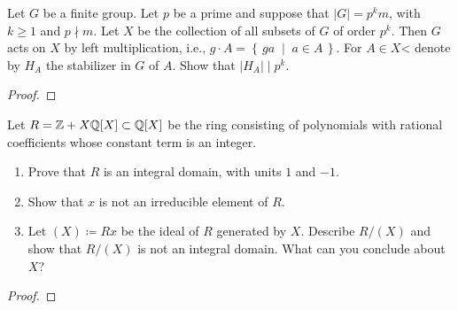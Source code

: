 \begin{problem}
Let $G$ be a finite group. Let $p$ be a prime and suppose that $|G|=p^km$,
with $k\geq 1$ and $p\nmid m$. Let $X$ be the collection of all subsets of
$G$ of order $p^k$. Then $G$ acts on $X$ by left multiplication, i.e.,
$g\cdot A=\left\{\,ga\;\middle|\;a\in A\,\right\}$. For $A\in X$< denote by
$H_A$ the stabilizer in $G$ of $A$. Show that $|H_A|\mid p^k$.
\end{problem}
\begin{proof}
\end{proof}

\begin{problem}
Let $R=\mathbb{Z}+X\mathbb{Q}[X]\subset\mathbb{Q}[X]$ be the ring consisting of polynomials
with rational coefficients whose constant term is an integer.
\begin{enumerate}[label=(\alph*)]
\item Prove that $R$ is an integral domain, with units $1$ and $-1$.
\item Show that $x$ is not an irreducible element of $R$.
\item Let $(X)\coloneqq Rx$ be the ideal of $R$ generated by $X$. Describe
  $R/(X)$ and show that $R/(X)$ is not an integral domain. What can you
  conclude about $X$?
\end{enumerate}
\end{problem}
\begin{proof}
\end{proof}

